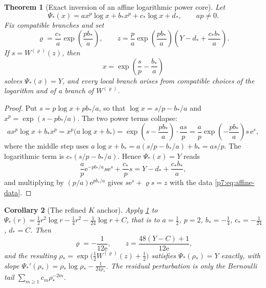 \documentclass[11pt,a4paper,oneside]{book}
\theoremstyle{plain}
\newtheorem{theorem}{Theorem}[chapter]
\newtheorem{corollary}[theorem]{Corollary}
\theoremstyle{definition}
\theoremstyle{remark}
\newcommand{\e}{\mathrm{e}}
\newcommand{\Wlam}{W}
\begin{document}
\begin{theorem}[Exact inversion of an affine logarithmic power core]
\label{p7:thm:affine-core}
Let
\begin{equation}\label{p7:eq:affine-core}
 \Psi_{\!*}(x)=a x^{p}\log x+b_{*}x^{p}+c_{*}\log x+d_{*},
 \qquad ap\ne0 .
\end{equation}
Fix compatible branches and set
\begin{equation}\label{p7:eq:affine-data}
 \varrho=\frac{c_{*}}a\exp\!\left(\frac{pb_{*}}a\right),
 \qquad
 z=\frac pa\exp\!\left(\frac{pb_{*}}a\right)
   \left(Y-d_{*}+\frac{c_{*}b_{*}}a\right).
\end{equation}
If $s=\Wlam^{(\varrho)}(z)$, then
\begin{equation}\label{p7:eq:affine-inverse}
 x=\exp\!\left(\frac sp-\frac{b_{*}}a\right)
\end{equation}
solves $\Psi_{\!*}(x)=Y$, and every local branch arises from compatible
choices of the logarithm and of a branch of $\Wlam^{(\varrho)}$.
\end{theorem}

\begin{proof}
Put $s=p\log x+pb_{*}/a$, so that $\log x=s/p-b_{*}/a$ and
$x^{p}=\exp(s-pb_{*}/a)$.  The two power terms collapse:
\[
 a x^{p}\log x+b_{*}x^{p}
 =x^{p}\bigl(a\log x+b_{*}\bigr)
 =\exp\!\left(s-\frac{pb_{*}}a\right)\cdot\frac{as}p
 =\frac ap\exp\!\left(-\frac{pb_{*}}a\right)s\,\e^{s},
\]
where the middle step uses $a\log x+b_{*}=a(s/p-b_{*}/a)+b_{*}=as/p$.  The
logarithmic term is $c_{*}(s/p-b_{*}/a)$.  Hence $\Psi_{\!*}(x)=Y$ reads
\[
 \frac ap\e^{-pb_{*}/a}s\e^{s}+\frac{c_{*}}ps
 =Y-d_{*}+\frac{c_{*}b_{*}}a ,
\]
and multiplying by $(p/a)\e^{pb_{*}/a}$ gives
$s\e^{s}+\varrho s=z$ with the data \eqref{p7:eq:affine-data}.
\end{proof}

\begin{corollary}[The refined $K$ anchor]\label{p7:cor:refined-anchor}
Apply \cref{p7:thm:affine-core} to
$\Psi_{\!*}(r)=\tfrac12r^{2}\log r-\tfrac14r^{2}-\tfrac1{24}\log r+C$,
that is to $a=\tfrac12$, $p=2$, $b_{*}=-\tfrac14$, $c_{*}=-\tfrac1{24}$,
$d_{*}=C$.  Then
\begin{equation}\label{p7:eq:K-refined-data}
 \varrho=-\frac1{12\e},
 \qquad
 z=\frac{48(Y-C)+1}{12\e},
\end{equation}
and the resulting $\rho_{*}=\exp\bigl(\tfrac12\Wlam^{(\varrho)}(z)+\tfrac12
\bigr)$ satisfies $\Psi_{\!*}(\rho_{*})=Y$ exactly, with slope
$\Psi_{\!*}'(\rho_{*})=\rho_{*}\log\rho_{*}-\tfrac1{24\rho_{*}}$.  The
residual perturbation is only the Bernoulli tail
$\sum_{m\ge1}c_m\rho_{*}^{-2m}$.
\end{corollary}
\end{document}

